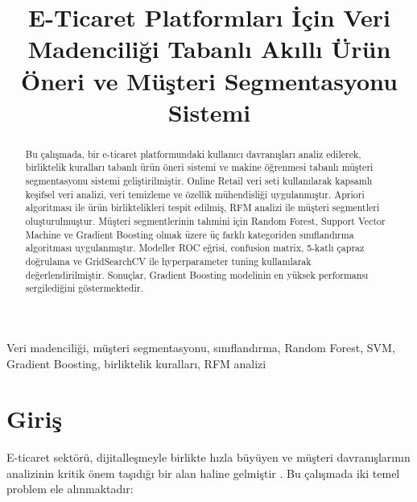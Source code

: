 \documentclass[conference]{IEEEtran}
\begin{document}
\title{E-Ticaret Platformları İçin Veri Madenciliği Tabanlı Akıllı Ürün Öneri ve Müşteri Segmentasyonu Sistemi}

\author{
}

\maketitle

\begin{abstract}
Bu çalışmada, bir e-ticaret platformundaki kullanıcı davranışları analiz edilerek, birliktelik kuralları tabanlı ürün öneri sistemi ve makine öğrenmesi tabanlı müşteri segmentasyonu sistemi geliştirilmiştir. Online Retail veri seti kullanılarak kapsamlı keşifsel veri analizi, veri temizleme ve özellik mühendisliği uygulanmıştır. Apriori algoritması ile ürün birliktelikleri tespit edilmiş, RFM analizi ile müşteri segmentleri oluşturulmuştur. Müşteri segmentlerinin tahmini için Random Forest, Support Vector Machine ve Gradient Boosting olmak üzere üç farklı kategoriden sınıflandırma algoritması uygulanmıştır. Modeller ROC eğrisi, confusion matrix, 5-katlı çapraz doğrulama ve GridSearchCV ile hyperparameter tuning kullanılarak değerlendirilmiştir. Sonuçlar, Gradient Boosting modelinin en yüksek performansı sergilediğini göstermektedir.
\end{abstract}

\begin{IEEEkeywords}
Veri madenciliği, müşteri segmentasyonu, sınıflandırma, Random Forest, SVM, Gradient Boosting, birliktelik kuralları, RFM analizi
\end{IEEEkeywords}

\section{Giriş}

E-ticaret sektörü, dijitalleşmeyle birlikte hızla büyüyen ve müşteri davranışlarının analizinin kritik önem taşıdığı bir alan haline gelmiştir \cite{han2011}. Bu çalışmada iki temel problem ele alınmaktadır:
\end{document}
